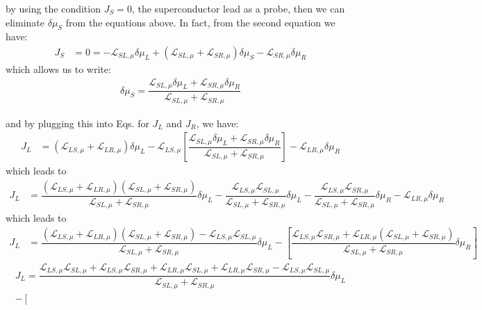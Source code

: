 by using the condition $J_{S}=0$, the superconductor lead as a probe, then we can eliminate $\delta\mu_{S}$ from the equations above. In fact, from the second equation we have:
\begin{align*}
J_{S}&=0=
-\mathcal{L}_{SL,\mu}\delta\mu_{L}
+
(\mathcal{L}_{SL,\mu}+\mathcal{L}_{SR,\mu})\delta\mu_{S}
-
\mathcal{L}_{SR,\mu}\delta\mu_{R}
\end{align*}
which allows us to write:
\begin{align}\label{delta:muS}
\delta\mu_{S}
=
\dfrac{\mathcal{L}_{SL,\mu}\delta\mu_{L}+\mathcal{L}_{SR,\mu}\delta\mu_{R}}{\mathcal{L}_{SL,\mu}+\mathcal{L}_{SR,\mu}}
\end{align}
\begin{widetext}
and by plugging this into Eqs. for $J_{L}$ and $J_{R}$, we have:
\begin{align*}
J_{L}&=
(\mathcal{L}_{LS,\mu}+\mathcal{L}_{LR,\mu})\delta\mu_{L}
-\mathcal{L}_{LS,\mu}\left[\dfrac{\mathcal{L}_{SL,\mu}\delta\mu_{L}+\mathcal{L}_{SR,\mu}\delta\mu_{R}}{\mathcal{L}_{SL,\mu}+\mathcal{L}_{SR,\mu}}\right]
-\mathcal{L}_{LR,\mu}\delta\mu_{R}
\end{align*}
which leads to
\begin{align*}
J_{L}&=
\dfrac{(\mathcal{L}_{LS,\mu}+\mathcal{L}_{LR,\mu})(\mathcal{L}_{SL,\mu}+\mathcal{L}_{SR,\mu})}{\mathcal{L}_{SL,\mu}+\mathcal{L}_{SR,\mu}}\delta\mu_{L}
-
\dfrac{\mathcal{L}_{LS,\mu}\mathcal{L}_{SL,\mu}}{\mathcal{L}_{SL,\mu}+\mathcal{L}_{SR,\mu}}\delta\mu_{L}
-
\dfrac{\mathcal{L}_{LS,\mu}\mathcal{L}_{SR,\mu}}{\mathcal{L}_{SL,\mu}+\mathcal{L}_{SR,\mu}}\delta\mu_{R}
-
\mathcal{L}_{LR,\mu}\delta\mu_{R}
\end{align*}
which leads to
\begin{align*}
J_{L}&=
\dfrac{(\mathcal{L}_{LS,\mu}+\mathcal{L}_{LR,\mu})(\mathcal{L}_{SL,\mu}+\mathcal{L}_{SR,\mu})-\mathcal{L}_{LS,\mu}\mathcal{L}_{SL,\mu}}{\mathcal{L}_{SL,\mu}+\mathcal{L}_{SR,\mu}}\delta\mu_{L}
-\left[
\dfrac{\mathcal{L}_{LS,\mu}\mathcal{L}_{SR,\mu}+\mathcal{L}_{LR,\mu}(\mathcal{L}_{SL,\mu}+\mathcal{L}_{SR,\mu})}{\mathcal{L}_{SL,\mu}+\mathcal{L}_{SR,\mu}}\delta\mu_{R}
\right]
\end{align*}
\begin{multline*}
J_{L}=
\dfrac{\mathcal{L}_{LS,\mu}\mathcal{L}_{SL,\mu}
+
\mathcal{L}_{LS,\mu}\mathcal{L}_{SR,\mu}
+
\mathcal{L}_{LR,\mu}\mathcal{L}_{SL,\mu}
+
\mathcal{L}_{LR,\mu}\mathcal{L}_{SR,\mu}-\mathcal{L}_{LS,\mu}\mathcal{L}_{SL,\mu}}{\mathcal{L}_{SL,\mu}+\mathcal{L}_{SR,\mu}}\delta\mu_{L}
\\-\left[

\end{multline*}
\end{widetext}
